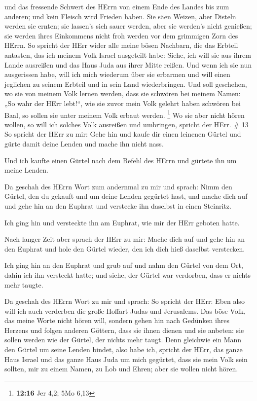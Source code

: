 und das fressende Schwert des HErrn von einem Ende des Landes bis zum
anderen; und kein Fleisch wird Frieden haben.  Sie säen
Weizen, aber Disteln werden sie ernten; sie lassen's sich sauer werden,
aber sie werden's nicht genießen; sie werden ihres Einkommens nicht froh
werden vor dem grimmigen Zorn des HErrn.  So spricht der
HErr wider alle meine bösen Nachbarn, die das Erbteil antasten, das ich
meinem Volk Israel ausgeteilt habe: Siehe, ich will sie aus ihrem Lande
ausreißen und das Haus Juda aus ihrer Mitte reißen.  Und
wenn ich sie nun ausgerissen habe, will ich mich wiederum über sie
erbarmen und will einen jeglichen zu seinem Erbteil und in sein Land
wiederbringen.  Und soll geschehen, wo sie von meinem Volk
lernen werden, dass sie schwören bei meinem Namen: „So wahr der HErr
lebt!{}``, wie sie zuvor mein Volk gelehrt haben schwören bei Baal, so
sollen sie unter meinem Volk erbaut werden. \footnote{\textbf{12:16} Jer
  4,2; 5Mo 6,13}  Wo sie aber nicht hören wollen, so will
ich solches Volk ausreißen und umbringen, spricht der HErr. \# 13
 So spricht der HErr zu mir: Gehe hin und kaufe dir einen
leinenen Gürtel und gürte damit deine Lenden und mache ihn nicht nass.

 Und ich kaufte einen Gürtel nach dem Befehl des HErrn und
gürtete ihn um meine Lenden.

 Da geschah des HErrn Wort zum andernmal zu mir und sprach:
 Nimm den Gürtel, den du gekauft und um deine Lenden
gegürtet hast, und mache dich auf und gehe hin an den Euphrat und
verstecke ihn daselbst in einen Steinritz.

 Ich ging hin und versteckte ihn am Euphrat, wie mir der
HErr geboten hatte.

 Nach langer Zeit aber sprach der HErr zu mir: Mache dich
auf und gehe hin an den Euphrat und hole den Gürtel wieder, den ich dich
hieß daselbst verstecken.

 Ich ging hin an den Euphrat und grub auf und nahm den
Gürtel von dem Ort, dahin ich ihn versteckt hatte; und siehe, der Gürtel
war verdorben, dass er nichts mehr taugte.

 Da geschah des HErrn Wort zu mir und sprach: 
So spricht der HErr: Eben also will ich auch verderben die große Hoffart
Judas und Jerusalems.  Das böse Volk, das meine Worte nicht
hören will, sondern gehen hin nach Gedünken ihres Herzens und folgen
anderen Göttern, dass sie ihnen dienen und sie anbeten: sie sollen
werden wie der Gürtel, der nichts mehr taugt.  Denn
gleichwie ein Mann den Gürtel um seine Lenden bindet, also habe ich,
spricht der HErr, das ganze Haus Israel und das ganze Haus Juda um mich
gegürtet, dass sie mein Volk sein sollten, mir zu einem Namen, zu Lob
und Ehren; aber sie wollen nicht hören.


